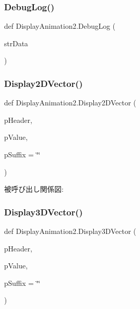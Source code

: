 \subsubsection{\texorpdfstring{Debug\+Log()}{DebugLog()}}
{\footnotesize\ttfamily def Display\+Animation2.\+Debug\+Log (\begin{DoxyParamCaption}\item[{}]{str\+Data }\end{DoxyParamCaption})}

\mbox{\label{namespace_display_animation2_a2ebee84f14939b0a486e0dad6cafc77d}} 
\subsubsection{\texorpdfstring{Display2\+D\+Vector()}{Display2DVector()}}
{\footnotesize\ttfamily def Display\+Animation2.\+Display2\+D\+Vector (\begin{DoxyParamCaption}\item[{}]{p\+Header,  }\item[{}]{p\+Value,  }\item[{}]{p\+Suffix = {\ttfamily \char`\"{}\char`\"{}} }\end{DoxyParamCaption})}

被呼び出し関係図\+:
\mbox{\label{namespace_display_animation2_ad0cd1a5d1ece0968b85d9df7fab75a36}} 
\subsubsection{\texorpdfstring{Display3\+D\+Vector()}{Display3DVector()}}
{\footnotesize\ttfamily def Display\+Animation2.\+Display3\+D\+Vector (\begin{DoxyParamCaption}\item[{}]{p\+Header,  }\item[{}]{p\+Value,  }\item[{}]{p\+Suffix = {\ttfamily \char`\"{}\char`\"{}} }\end{DoxyParamCaption})}


